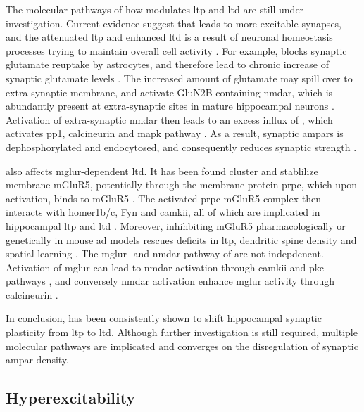 The molecular pathways of how \abeta{} modulates \gls{ltp} and \gls{ltd} are still under investigation. Current evidence suggest that \abeta{} leads to more excitable synapses, and the attenuated \gls{ltp} and enhanced \gls{ltd} is a result of neuronal homeostasis processes trying to maintain overall cell activity \citep{guntupalli16, jang16}. For example, \abeta{} blocks synaptic glutamate reuptake by astrocytes, and therefore lead to chronic increase of synaptic glutamate levels \citep{matos08, li09}. The increased amount of glutamate may spill over to extra-synaptic membrane, and activate GluN2B-containing \gls{nmdar}, which is abundantly present at extra-synaptic sites in mature hippocampal neurons \citep{citri08, li11, shipton14}. Activation of extra-synaptic \gls{nmdar} then leads to an excess influx of , which activates \gls{pp1}, calcineurin and \gls{mapk} pathway \citep{hsieh06, shankar07, zhao10}. As a result, synaptic \glspl{ampar} is dephosphorylated and endocytosed, and consequently reduces synaptic strength \citep{hsieh06, liu10, minanomolina11}. 

\abeta{} also affects \gls{mglur}-dependent \gls{ltd}. It has been found \abeta{} cluster and stablilize membrane mGluR5, potentially through the membrane protein \gls{prpc}, which upon \abeta{} activation, binds to mGluR5 \citep{renner10, um13}. The activated \gls{prpc}-mGluR5 complex then interacts with homer1b/c, Fyn and \gls{camkii}, all of which are implicated in hippocampal \gls{ltp} and \gls{ltd} \citep{raka15, haas16}. Moreover, inhihbiting mGluR5 pharmacologically or genetically in mouse \gls{ad} models rescues deficits in \gls{ltp}, dendritic spine density and spatial learning \citep{rammes11, hu14, um13, hamilton14}. The \gls{mglur}- and \gls{nmdar}-pathway of \abeta{} are not indepdenent. Activation of \gls{mglur} can lead to \gls{nmdar} activation through \gls{camkii} and \gls{pkc} pathways \citep{chen11, jin15}, and conversely \gls{nmdar} activation enhance \gls{mglur} activity through calcineurin \citep{alagarsamy99, alagarsamy05}. 

In conclusion, \abeta{} has been consistently shown to shift hippocampal synaptic plasticity from \gls{ltp} to \gls{ltd}. Although further investigation is still required, multiple molecular pathways are implicated and converges on the disregulation of synaptic \gls{ampar} density. 

\subsection{Hyperexcitability}

